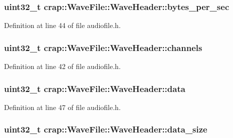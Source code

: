 \subsubsection[{bytes\+\_\+per\+\_\+sec}]{\setlength{\rightskip}{0pt plus 5cm}uint32\+\_\+t crap\+::\+Wave\+File\+::\+Wave\+Header\+::bytes\+\_\+per\+\_\+sec}\label{structcrap_1_1_wave_file_1_1_wave_header_a3646f53398f2436d4ca44a9ba40fff46}


Definition at line 44 of file audiofile.\+h.

\hypertarget{structcrap_1_1_wave_file_1_1_wave_header_a8b7a99f75e7053e7de41704a531af9fb}{}
\subsubsection[{channels}]{\setlength{\rightskip}{0pt plus 5cm}uint32\+\_\+t crap\+::\+Wave\+File\+::\+Wave\+Header\+::channels}\label{structcrap_1_1_wave_file_1_1_wave_header_a8b7a99f75e7053e7de41704a531af9fb}


Definition at line 42 of file audiofile.\+h.

\hypertarget{structcrap_1_1_wave_file_1_1_wave_header_af483dcde797314d2a0b7ec47de0ee90c}{}
\subsubsection[{data}]{\setlength{\rightskip}{0pt plus 5cm}uint32\+\_\+t crap\+::\+Wave\+File\+::\+Wave\+Header\+::data}\label{structcrap_1_1_wave_file_1_1_wave_header_af483dcde797314d2a0b7ec47de0ee90c}


Definition at line 47 of file audiofile.\+h.

\hypertarget{structcrap_1_1_wave_file_1_1_wave_header_a10f71511e169d4e3c1f9ebffd89cf7a3}{}
\subsubsection[{data\+\_\+size}]{\setlength{\rightskip}{0pt plus 5cm}uint32\+\_\+t crap\+::\+Wave\+File\+::\+Wave\+Header\+::data\+\_\+size}\label{structcrap_1_1_wave_file_1_1_wave_header_a10f71511e169d4e3c1f9ebffd89cf7a3}


